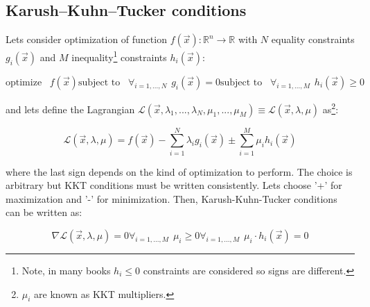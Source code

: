\subsection{Karush–Kuhn–Tucker conditions}
\label{sec: kkt}

Lets consider optimization of function $f (\vec x) : \mathbb{R}^n \rightarrow \mathbb{R}$ with $N$ equality constraints $g_i (\vec x)$ and $M$ inequality\footnote{Note, in many books $h_i \leq 0$ constraints are considered so signs are different.} constraints $h_i (\vec x)$:

\begin{subequations}
 \begin{equation}
  \text{optimize}\hspace{10pt} f (\vec x)
 \end{equation}
 \begin{equation}
  \text{subject to}\hspace{10pt}\forall_{i=1,...,N}\hspace{5pt} g_i(\vec x) = 0
  \label{eq: pf1}
 \end{equation}
 \begin{equation}
  \text{subject to}\hspace{10pt}\forall_{i=1,...,M}\hspace{5pt} h_i(\vec x) \geq 0
  \label{eq: pf2}
 \end{equation}
 \label{eq: optimizationKKT}
\end{subequations}

and lets define the Lagrangian $\mathcal{L} (\vec x, \lambda_1, ..., \lambda_N, \mu_1, ... , \mu_M) \equiv \mathcal{L} (\vec x, \lambda, \mu)$ as\footnote{$\mu_i$ are known as KKT multipliers.}:

\begin{equation}
  \mathcal{L} (\vec x, \lambda, \mu) = f(\vec x) - \sum_{i = 1}^N\lambda_i g_i (\vec x) \pm \sum_{i = 1}^M\mu_i h_i (\vec x)
  \label{eq: lagrKKT}
\end{equation}

where the last sign depends on the kind of optimization to perform. The choice is arbitrary but KKT conditions must be written consistently. Lets choose '+' for maximization and '-' for minimization. Then, Karush-Kuhn-Tucker conditions can be written as:

\begin{subequations}
 \begin{equation}
  \nabla \mathcal{L} (\vec x, \lambda, \mu) = 0
  \label{eq: kktS}
 \end{equation}
 \begin{equation}
  \forall_{i=1,...,M} \hspace{5pt} \mu_i \geq 0
  \label{eq: kktD}
 \end{equation}
 \begin{equation}
  \forall_{i=1,...,M} \hspace{5pt} \mu_i \cdot h_i (\vec x) = 0
  \label{eq: kktCS}
 \end{equation}
 \label{eq: kkt}
\end{subequations}

